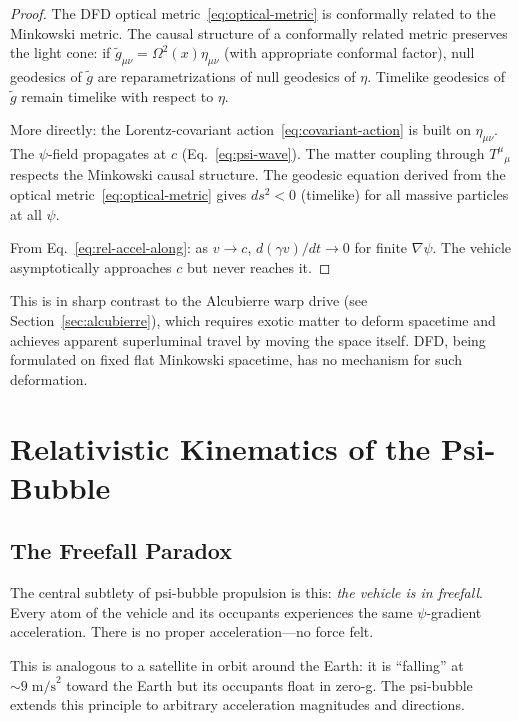 \documentclass[aps,prd,twocolumn,superscriptaddress,nofootinbib]{revtex4-2}
\begin{document}
\begin{proof}
The DFD optical metric~\eqref{eq:optical-metric} is conformally
related to the Minkowski metric.  The causal structure of a
conformally related metric preserves the light cone: if
$\tilde{g}_{\mu\nu} = \Omega^2(x)\eta_{\mu\nu}$ (with appropriate
conformal factor), null geodesics of $\tilde{g}$ are reparametrizations
of null geodesics of $\eta$.  Timelike geodesics of $\tilde{g}$ remain
timelike with respect to $\eta$.

More directly: the Lorentz-covariant action~\eqref{eq:covariant-action}
is built on $\eta_{\mu\nu}$.  The $\psi$-field propagates at $c$
(Eq.~\ref{eq:psi-wave}).  The matter coupling through $T^\mu{}_\mu$
respects the Minkowski causal structure.  The geodesic equation
derived from the optical metric~\eqref{eq:optical-metric} gives
$ds^2 < 0$ (timelike) for all massive particles at all $\psi$.

From Eq.~\eqref{eq:rel-accel-along}: as $v \to c$,
$d(\gamma v)/dt \to 0$ for finite $\nabla\psi$.  The vehicle
asymptotically approaches $c$ but never reaches it.
\end{proof}

This is in sharp contrast to the Alcubierre warp drive (see
Section~\ref{sec:alcubierre}), which requires exotic matter to
deform spacetime and achieves apparent superluminal travel by moving
the space itself.  DFD, being formulated on fixed flat Minkowski
spacetime, has no mechanism for such deformation.

\section{Relativistic Kinematics of the Psi-Bubble}\label{sec:kinematics}

\subsection{The Freefall Paradox}

The central subtlety of psi-bubble propulsion is this: \textit{the
vehicle is in freefall}.  Every atom of the vehicle and its occupants
experiences the same $\psi$-gradient acceleration.  There is no proper
acceleration---no force felt.

This is analogous to a satellite in orbit around the Earth: it is
``falling'' at $\sim 9\;\text{m/s}^2$ toward the Earth but its
occupants float in zero-g.  The psi-bubble extends this principle
to arbitrary acceleration magnitudes and directions.
\end{document}
